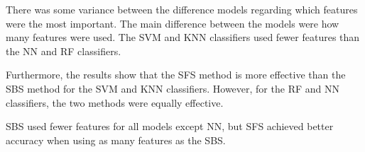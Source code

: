 \documentclass{kththesis}
\begin{document}
There was some variance between the difference models regarding which features were the most important. The main difference between the models were how many features were used. The SVM and KNN classifiers used fewer features than the NN and RF classifiers. 

Furthermore, the results show that the SFS method is more effective than the SBS method for the SVM and KNN classifiers. However, for the RF and NN classifiers, the two methods were equally effective.

SBS used fewer features for all models except NN, but SFS achieved better accuracy when using as many features as the SBS. %

\printbibliography[heading=bibintoc]


\tailmatter
\end{document}
